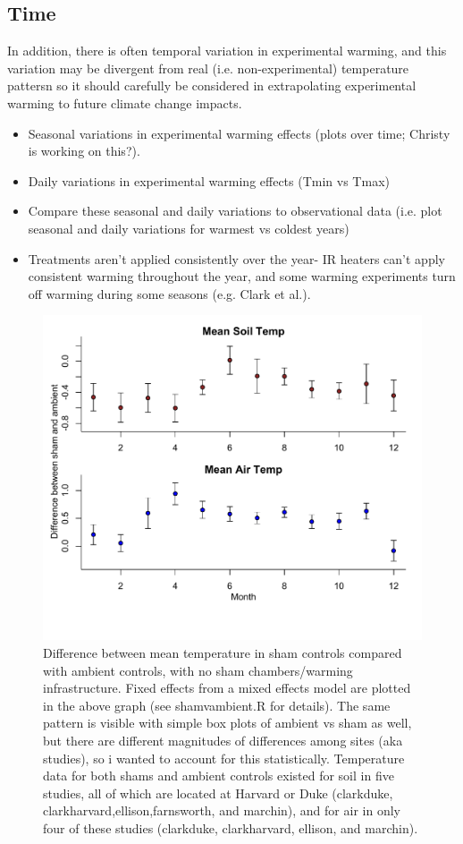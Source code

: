 \documentclass{article}
\begin{document}
\subsection {Time}
In addition, there is often temporal variation in experimental warming, and this variation may be divergent from real (i.e. non-experimental) temperature pattersn so it should carefully be considered in extrapolating experimental warming to future climate change impacts.
\begin{itemize}
\item Seasonal variations in experimental warming effects (plots over time; Christy is working on this?).
\item Daily variations in experimental warming effects (Tmin vs Tmax)
\item Compare these seasonal and daily variations to observational data (i.e. plot seasonal and daily variations for warmest vs coldest years)
\item Treatments aren’t applied consistently over the year- IR heaters can't
apply consistent warming throughout the year, and some warming experiments turn off warming during some seasons (e.g. Clark et al.).
\end{itemize}
\begin{figure}[p]
    \centering
\includegraphics{Analyses/figures/ShamVSAmbient_mean.pdf}    
\caption{Difference between mean temperature in sham controls compared with ambient controls, with no sham chambers/warming infrastructure. Fixed effects from a mixed effects model are plotted in the above graph (see shamvambient.R for details). The same pattern is visible with simple box plots of ambient vs sham as well, but there are different magnitudes of differences among sites (aka studies), so i wanted to account for this statistically. Temperature data for both shams and ambient controls existed for soil in five studies, all of which are located at Harvard or Duke (clarkduke, clarkharvard,ellison,farnsworth, and marchin), and for air in only four of these studies (clarkduke, clarkharvard, ellison, and marchin). }
\end{figure}
\end{document}
